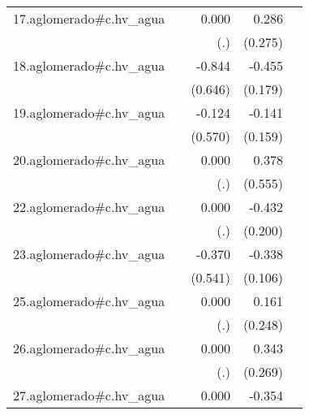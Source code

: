 {\begin{longtable}{l*{4}{D{.}{.}{-1}}}
\addlinespace
17.aglomerado#c.hv\_agua&                     &       0.000         &       0.286         &                     \\
            &                     &         (.)         &     (0.275)         &                     \\
\addlinespace
18.aglomerado#c.hv\_agua&                     &      -0.844         &      -0.455\sym{*}  &                     \\
            &                     &     (0.646)         &     (0.179)         &                     \\
\addlinespace
19.aglomerado#c.hv\_agua&                     &      -0.124         &      -0.141         &                     \\
            &                     &     (0.570)         &     (0.159)         &                     \\
\addlinespace
20.aglomerado#c.hv\_agua&                     &       0.000         &       0.378         &                     \\
            &                     &         (.)         &     (0.555)         &                     \\
\addlinespace
22.aglomerado#c.hv\_agua&                     &       0.000         &      -0.432\sym{*}  &                     \\
            &                     &         (.)         &     (0.200)         &                     \\
\addlinespace
23.aglomerado#c.hv\_agua&                     &      -0.370         &      -0.338\sym{**} &                     \\
            &                     &     (0.541)         &     (0.106)         &                     \\
\addlinespace
25.aglomerado#c.hv\_agua&                     &       0.000         &       0.161         &                     \\
            &                     &         (.)         &     (0.248)         &                     \\
\addlinespace
26.aglomerado#c.hv\_agua&                     &       0.000         &       0.343         &                     \\
            &                     &         (.)         &     (0.269)         &                     \\
\addlinespace
27.aglomerado#c.hv\_agua&                     &       0.000         &      -0.354         &                     \\

\end{longtable}}
